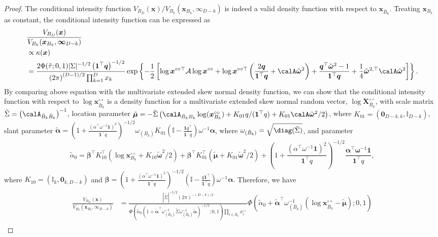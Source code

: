 \documentclass[12pt]{article}
\begin{document}
\begin{proof}
The conditional intensity function $V_{B_D}(\bm x)/V_{B_k}(\bm x_{B_k},\bm \infty_{D-k})$ is indeed a valid density function \citep{Wadsworth.Tawn:2013} with respect to $\bm x_{\bar B_k}$. Treating $\bm x_{B_k}$ as constant, the conditional intensity function can be expressed as 
\begin{align*}
    & \frac{V_{B_D}(\bm x)}{V_{B_k}(\bm x_{B_k},\bm \infty_{D-k})} \\
    & \propto \kappa(\bm x) \\
    & = \frac{2\Phi(\tilde{\tau};0,1)| \Sigma |^{-1/2} \left( \bm 1^\top \bm q\right)^{-1/2}}{\left( 2\pi \right)^{(D-1)/2}\prod_{k=1}^Dx_k}\exp \left\{ -\frac{1}{2} \left[ \log \bm x^{\circ\circ\top} \mathcal{A} \log \bm x^{\circ\circ} + \log \bm x^{\circ\circ\top} \left( \frac{2 \bm q}{\bm 1^\top \bm q}+\calA\tilde{\bm\omega}^2\right) + \frac{\bm q^\top\tilde{\bm \omega}^2 - 1}{\bm 1 ^\top \bm q } + \frac{1}{4}\tilde{\bm\omega}^{2,\top}\calA\tilde{\bm\omega}^2 \right]\right\}.
\end{align*}    
 By comparing above equation with the multivariate extended skew normal density function, we can show that the conditional intensity function with respect to $\log\bm x_{\bar B_k}^{\circ\circ}$ is a density function for a multivariate  extended skew normal random vector, $\log\bm X_{\bar B_k}^{\circ\circ}$, with scale matrix $\tilde\Sigma = \left(\calA_{\bar B_k\bar B_k}\right)^{-1}$, location parameter $\tilde{\bm\mu} = -\tilde\Sigma\left(\calA_{\bar B_kB_k}\log(\bm x_{B_k}^{\circ\circ}) + K_{01}q/(\bm 1^\top q)+K_{01}\calA\tilde{\bm\omega}^2/2\right)$, where $K_{01} = (\bm 0_{D-k,k},\mathbb I_{D-k})$, slant parameter $\tilde{\bm\alpha}=\left(1 + \frac{\left(\alpha^\top\omega^{-1}\bm 1\right)^2}{\bm 1^\top q}\right)^{-1/2}\omega_{(\bar B_k)} K_{01}\left(\mathbb{I} - \frac{\bm 1 q^\top}{\bm 1^\top q}\right)\omega^{-1}\bm\alpha$, where $\omega_{(\bar B_k)}=\sqrt{\diag(\tilde\Sigma)}$, and parameter 
$$\tilde\alpha_0 = \bm\beta^\top K_{10}^\top(\log \bm x_{B_k}^{\circ\circ}+K_{10}\tilde{\bm\omega}^2/2) + \bm\beta^\top K_{01}^\top(\tilde{\bm\mu} + K_{01}\tilde{\bm\omega}^2/2) +  \left(1 + \frac{(\alpha^\top\omega^{-1}\bm 1)^2}{\bm 1^\top q}\right)^{-1/2}\frac{\bm\alpha^\top\bm\omega^{-1}\bm 1}{\bm 1^\top q},$$ 
where $K_{10} = (\mathbb I_{k},\bm 0_{k,D-k})$ and
$\bm\beta = \left(1 + \frac{(\alpha^\top\omega^{-1}\bm 1)^2}{\bm 1^\top q}\right)^{-1/2}\left(\mathbb I - \frac{q\bm 1^\top}{\bm 1^\top q}\right)\omega^{-1}\bm\alpha.$
Therefore, we have
\begin{align*}
\frac{V_{B_D}(\bm x)}{V_{B_k}(\bm x_{B_k},\bm \infty_{D-k})} &= \frac{|\tilde\Sigma|^{-1/2}(2\pi)^{-(D-k)/2}}{\Phi\left(\tilde\alpha_0\left(1+\tilde{\bm\alpha}^\top\omega_{(\bar B_k)}^{-1}\tilde\Sigma\omega_{(\bar B_k)}^{-1}\tilde{\bm\alpha}\right)^{-1/2};0,1\right) \prod_{i\in\bar B_k}x_i^{\circ\circ}} \Phi\left(\tilde\alpha_0 + \tilde{\bm\alpha}^\top\omega_{(\bar B_k)}^{-1}\left(\log \bm x_{\bar B_k}^{\circ\circ} - \tilde{\bm\mu}\right);0,1\right) \\

\end{align*}
\end{proof}
\end{document}
